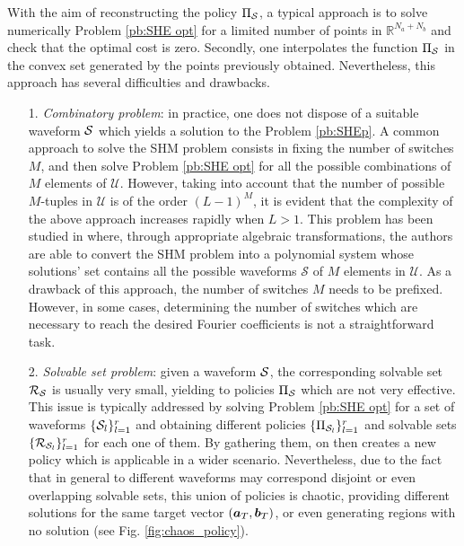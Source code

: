 \documentclass[twocolumn]{autart}    %
\begin{document}
With the aim of reconstructing the policy $\Pi_{\mathcal{S}}$, a typical approach is to solve numerically Problem \ref{pb:SHE opt} for a limited number of points in $\mathbb{R}^{N_a+N_b}$ and check that the optimal cost is zero. Secondly, one interpolates the function $\Pi_{\mathcal{S}}$ in the convex set generated by the points previously obtained. Nevertheless, this approach has several difficulties and drawbacks.

\begin{itemize}
	\item[1.] \textit{Combinatory problem}: in practice, one does not dispose of a suitable waveform $\mathcal{S}$ which yields a solution to the Problem \ref{pb:SHEp}. A common approach to solve the SHM problem consists in fixing the number of switches $M$, and then solve Problem \ref{pb:SHE opt} for  all the possible combinations of $M$ elements of $\mathcal{U}$. However, taking into account that the number of possible $M$-tuples  in $\mathcal U$ is of the order $(L-1)^M$, it is evident that the complexity of the above approach increases rapidly when $L>1$. This problem has been studied in \cite{Yang2015} where, through appropriate algebraic transformations, the authors are able to convert the SHM problem into a polynomial system whose solutions' set contains all the possible waveforms $\mathcal S$ of $M$ elements in $\mathcal{U}$. As a drawback of this approach, the number of switches $M$ needs to be prefixed. However, in some cases,  determining the number of switches which are necessary to reach the desired Fourier coefficients is not a straightforward task.
	
	\item[2.] \textit{Solvable set problem}: given a waveform $\mathcal{S}$, the corresponding solvable set $\mathcal{R}_{\mathcal{S}}$ is usually very small, yielding to policies $\Pi_{\mathcal{S}}$ which are not very effective. This issue is typically addressed by solving Problem \ref{pb:SHE opt} for a set of waveforms $\{\mathcal{S}_l\}_{l=1}^r$ and obtaining different policies $\{\Pi_{\mathcal{S}_l}\}_{l=1}^r$ and solvable sets $\{\mathcal{R}_{\mathcal{S}_l}\}_{l=1}^r$ for each one of them. By gathering them, on then creates a new policy which is applicable in a wider scenario. Nevertheless, due to the fact that in general to different waveforms may correspond disjoint or even overlapping solvable sets, this union of policies is chaotic, providing different solutions for the same target vector $(\bm{a}_T,\bm{b}_T)$, or even generating regions with no solution (see Fig. \ref{fig:chaos_policy}).
	

\end{itemize}
\end{document}

